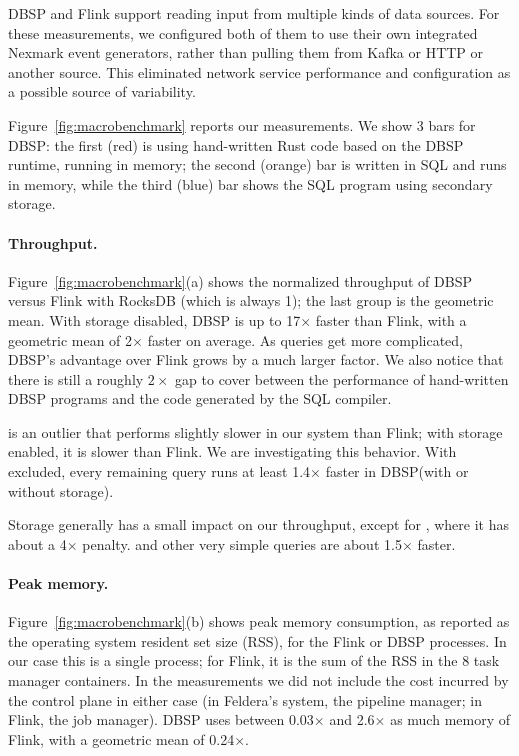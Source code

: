\documentclass[twocolumn
]{svjour3}
\numberwithin{equation}{section}
\newcommand{\dbsp}{DBSP\xspace}
\begin{document}
\dbsp and Flink support reading input from multiple kinds of data
sources.  For these measurements, we configured both of them to use
their own integrated Nexmark event generators, rather than pulling
them from Kafka or HTTP or another source.  This eliminated network
service performance and configuration as a possible source of
variability.

Figure~\ref{fig:macrobenchmark} reports our measurements.  We show 3
bars for \dbsp: the first (red) is using hand-written Rust code based
on the \dbsp runtime, running in memory; the second (orange) bar is
written in SQL and runs in memory, while the third (blue) bar shows the
SQL program using secondary storage.

\paragraph{Throughput.}

\newcommand{\x}{\(\times\)}

Figure~\ref{fig:macrobenchmark}(a) shows the normalized throughput of
\dbsp versus Flink with RocksDB (which is always 1); the last group is
the geometric mean.  With storage disabled, \dbsp is up to 17\x{}
faster than Flink, with a geometric mean of 2\x{} faster on average.
As queries get more complicated, \dbsp's advantage over Flink grows by
a much larger factor.  We also notice that there is still a roughly
$2\times{}$ gap to cover between the performance of hand-written \dbsp
programs and the code generated by the SQL compiler.

 is an outlier that performs slightly slower in our system
than Flink; with storage enabled, it is slower than Flink.  We are
investigating this behavior.  With  excluded, every
remaining query runs at least 1.4\x{} faster in \dbsp (with or without
storage).

Storage generally has a small impact on our throughput, except for
, where it has about a 4\x{} penalty.   and other
very simple queries are about 1.5\x{} faster.

\paragraph{Peak memory.}

Figure~\ref{fig:macrobenchmark}(b) shows peak memory consumption, as
reported as the operating system resident set size (RSS), for the
Flink or \dbsp processes.  In our case this is a single process; for
Flink, it is the sum of the RSS in the 8 task manager containers.  In
the measurements we did not include the cost incurred by the control
plane in either case (in Feldera's system, the pipeline manager; in
Flink, the job manager).  \dbsp uses between 0.03\x{} and 2.6\x{} as
much memory of Flink, with a geometric mean of 0.24\x{}.
\end{document}
